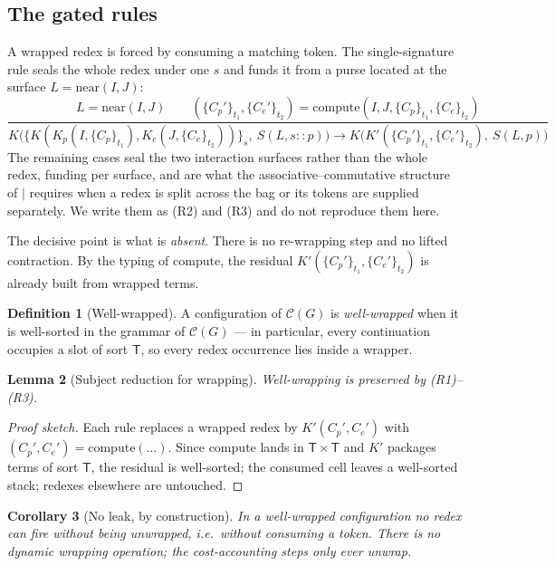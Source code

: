\documentclass[11pt]{article}
\theoremstyle{definition}
\newtheorem{definition}{Definition}[section]
\theoremstyle{plain}
\newtheorem{lemma}[definition]{Lemma}
\newtheorem{corollary}[definition]{Corollary}
\theoremstyle{remark}
\newcommand{\Tw}{\mathsf{T}}
\newcommand{\cost}{\mathcal{C}}
\newcommand{\compute}{\mathrm{compute}}
\newcommand{\near}{\mathrm{near}}
\begin{document}
\subsection{The gated rules}

A wrapped redex is forced by consuming a matching token. The single-signature rule seals
the whole redex under one $s$ and funds it from a purse located at the surface
$L = \near(I,J)$:
\[
  \frac{L = \near(I,J) \qquad
        (\{C_p'\}_{t_1}, \{C_e'\}_{t_2}) = \compute(I,J,\{C_p\}_{t_1},\{C_e\}_{t_2})}
       {K\bigl(\{K(K_p(I,\{C_p\}_{t_1}), K_e(J,\{C_e\}_{t_2}))\}_s,\ S(L, s::p)\bigr)
        \longrightarrow
        K\bigl(K'(\{C_p'\}_{t_1}, \{C_e'\}_{t_2}),\ S(L,p)\bigr)}
  \tag{R1}
\]
The remaining cases seal the two interaction surfaces rather than the whole redex,
funding per surface, and are what the associative--commutative structure of $\mid$
requires when a redex is split across the bag or its tokens are supplied separately. We
write them as (R2) and (R3) and do not reproduce them here.

The decisive point is what is \emph{absent}. There is no re-wrapping step and no lifted
contraction. By the typing of $\compute$, the residual $K'(\{C_p'\}_{t_1},
\{C_e'\}_{t_2})$ is already built from wrapped terms.

\begin{definition}[Well-wrapped]
A configuration of $\cost(G)$ is \emph{well-wrapped} when it is well-sorted in the
grammar of $\cost(G)$ --- in particular, every continuation occupies a slot of sort
$\Tw$, so every redex occurrence lies inside a wrapper.
\end{definition}

\begin{lemma}[Subject reduction for wrapping]
Well-wrapping is preserved by (R1)--(R3).
\end{lemma}

\begin{proof}[Proof sketch]
Each rule replaces a wrapped redex by $K'(C_p',C_e')$ with $(C_p',C_e') = \compute(\dots)$.
Since $\compute$ lands in $\Tw \times \Tw$ and $K'$ packages terms of sort $\Tw$, the
residual is well-sorted; the consumed cell leaves a well-sorted stack; redexes elsewhere
are untouched.
\end{proof}

\begin{corollary}[No leak, by construction]
In a well-wrapped configuration no redex can fire without being unwrapped, i.e.\ without
consuming a token. There is no dynamic wrapping operation; the cost-accounting steps only
ever unwrap.
\end{corollary}
\end{document}
